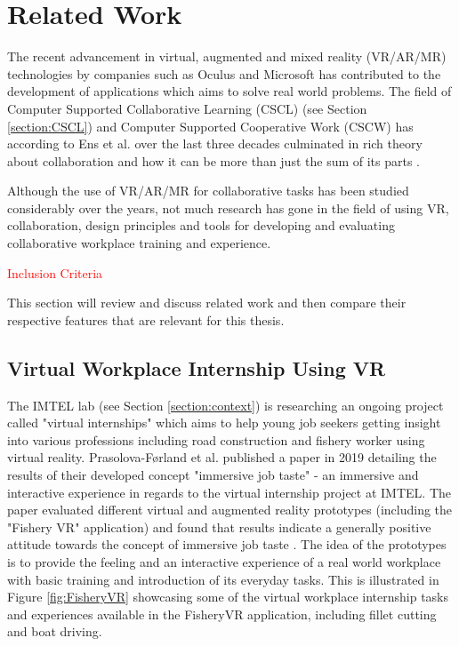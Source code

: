 
\chapter{Related Work}
The recent advancement in virtual, augmented and mixed reality (VR/AR/MR) technologies by companies such as Oculus and Microsoft 
has contributed to the development of applications which aims to solve real world problems. The field of Computer Supported Collaborative Learning (CSCL) (see Section \ref{section:CSCL}) and Computer Supported Cooperative Work (CSCW) has according to Ens et al. over the last three decades culminated in rich theory about collaboration and how it can be more than just the sum of its parts \cite{ens2019revisiting}.

Although the use of VR/AR/MR for collaborative tasks has been studied considerably over the years, not much research has gone in the field of using VR, collaboration, design principles and tools for developing and evaluating collaborative workplace training and experience. 

\textcolor{red}{Inclusion Criteria}

This section will review and discuss related work and then compare their respective features that are relevant for this thesis. 




\section{Virtual Workplace Internship Using VR}
The IMTEL lab (see Section \ref{section:context}) is researching an ongoing project called "virtual internships" which aims to help young job seekers getting insight into various professions including road construction and fishery worker using virtual reality. Prasolova-Førland et al. \cite{prasolova2019empowering} published a paper in 2019 detailing the results of their developed concept "immersive job taste" - an immersive and interactive experience in regards to the virtual internship project at IMTEL. The paper evaluated different virtual and augmented reality prototypes (including the "Fishery VR" application) and found that results indicate a generally positive attitude towards the concept of immersive job taste \cite{prasolova2019empowering}. The idea of the prototypes is to provide the feeling and an interactive experience of a real world workplace with basic training and introduction of its everyday tasks. This is illustrated in Figure \ref{fig:FisheryVR} showcasing some of the virtual workplace internship tasks and experiences available in the FisheryVR application, including fillet cutting and boat driving. 

